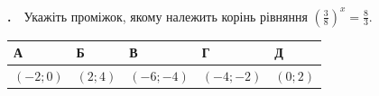 \documentclass[12pt]{article}
\newlength{\nmtcellw}
\newcommand{\nmtSetCell}{\setlength{\nmtcellw}{\dimexpr(\linewidth-10\tabcolsep-6\arrayrulewidth)/5\relax}}
\newcommand{\answerTable}[5]{%
\par\nopagebreak\vspace{0.15cm}
\noindent\nmtSetCell
\begin{tabular}{|*{5}{>{\centering\arraybackslash}m{\nmtcellw}|}}
\hline
\rule[-0.15cm]{0pt}{0.6cm}\textbf{А} & \rule[-0.15cm]{0pt}{0.6cm}\textbf{Б} & \rule[-0.15cm]{0pt}{0.6cm}\textbf{В} & \rule[-0.15cm]{0pt}{0.6cm}\textbf{Г} & \rule[-0.15cm]{0pt}{0.6cm}\textbf{Д} \\
\hline
\rule[-0.2cm]{0pt}{0.75cm}#1 & \rule[-0.2cm]{0pt}{0.75cm}#2 & \rule[-0.2cm]{0pt}{0.75cm}#3 & \rule[-0.2cm]{0pt}{0.75cm}#4 & \rule[-0.2cm]{0pt}{0.75cm}#5 \\
\hline
\end{tabular}
\par\vspace{0.25cm}
}
\newcommand{\matchingGrid}{%
    \sbox{\nmtgridbox}{\matchingGridRaw}%
    \ifdim\wd\nmtgridbox>\linewidth \resizebox{\linewidth}{!}{\usebox{\nmtgridbox}}\else\usebox{\nmtgridbox}\fi}
\newcommand{\matchingGridRaw}{%
    \begingroup
    \renewcommand{\arraystretch}{1.15}
    \setlength{\tabcolsep}{4pt}
    \footnotesize
    \begin{tabular}{r|c|c|c|c|c|}
         \multicolumn{1}{c}{} & \multicolumn{1}{c}{\textbf{А}} & \multicolumn{1}{c}{\textbf{Б}} & \multicolumn{1}{c}{\textbf{В}} & \multicolumn{1}{c}{\textbf{Г}} & \multicolumn{1}{c}{\textbf{Д}} \\ \cline{2-6}
         \textbf{1} & \phantom{X} & \phantom{X} & \phantom{X} & \phantom{X} & \phantom{X} \\ \cline{2-6}
         \textbf{2} & & & & & \\ \cline{2-6}
         \textbf{3} & & & & & \\ \cline{2-6}
    \end{tabular}
    \endgroup
}
\newcounter{zad}
\newcommand{\zadnum}{\stepcounter{zad}\textbf{\thezad.}\ \ }
\newcounter{ans}
\newcommand{\nmtnobreak}{\ifvmode\penalty10000 \fi}
\begin{document}
\providecommand{\trigStyle}[1]{#1}
\providecommand{\answerTableSmall}[5]{%
\begingroup\setlength{\tabcolsep}{2pt}\small\nmtSetCell
\begin{tabular}{|*{5}{>{\centering\arraybackslash}m{\nmtcellw}|}}
\hline
\rule[-0.2cm]{0pt}{0.6cm}\textbf{А} & \textbf{Б} & \textbf{В} & \textbf{Г} & \textbf{Д} \\
\hline
\rule[-0.4cm]{0pt}{0.9cm}#1 & \rule[-0.4cm]{0pt}{0.9cm}#2 & \rule[-0.4cm]{0pt}{0.9cm}#3 & \rule[-0.4cm]{0pt}{0.9cm}#4 & \rule[-0.4cm]{0pt}{0.9cm}#5 \\
\hline
\end{tabular}\endgroup}
\providecommand{\matchingLayout}[3]{%
    \noindent
    \begin{minipage}[t]{0.36\textwidth}\vspace{0pt}\raggedright
        #1
    \end{minipage}%
    \hfill
    \begin{minipage}[t]{0.43\textwidth}\vspace{0pt}\raggedright
        #2
    \end{minipage}%
    \hfill
    \begin{minipage}[t]{0.19\textwidth}
        \vspace{0pt}
        \begin{flushright}
        #3
        \end{flushright}
    \end{minipage}}
\providecommand{\matchingLayoutBottom}[2]{%
    \noindent
    \begin{minipage}[t]{0.48\textwidth}\vspace{0pt}\raggedright
        #1
    \end{minipage}%
    \hfill
    \begin{minipage}[t]{0.48\textwidth}\vspace{0pt}\raggedright
        #2
    \end{minipage}
    \vspace{0.5cm}
    \noindent
    \matchingGrid}
\providecommand{\answerListVertical}[5]{%
    \par\nopagebreak\vspace{0.2cm}
    \begin{itemize}[itemsep=0.4cm, leftmargin=1.5cm, labelsep=0.5cm]
        \item[\textbf{А}] #1
        \item[\textbf{Б}] #2
        \item[\textbf{В}] #3
        \item[\textbf{Г}] #4
        \item[\textbf{Д}] #5
    \end{itemize}
    \vspace{0.2cm}}
\begin{samepage}
\noindent\zadnum Укажіть проміжок, якому належить корінь рівняння $\left(\displaystyle\frac{3}{8}\right)^x = \displaystyle\frac{8}{3}$.

\nmtnobreak
\answerTable{$(-2; 0)$}{$(2; 4)$}{$(-6; -4)$}{$(-4; -2)$}{$(0; 2)$}
\par{}
\end{samepage}
\endgroup
\end{document}

